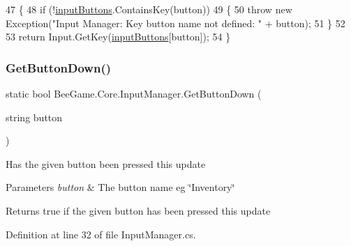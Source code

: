 \begin{DoxyCode}
47         \{
48             \textcolor{keywordflow}{if} (!\hyperlink{class_bee_game_1_1_core_1_1_input_manager_ad0a5b4a5db00803c01ecb3431e208ca1}{inputButtons}.ContainsKey(button))
49             \{
50                 \textcolor{keywordflow}{throw} \textcolor{keyword}{new} Exception(\textcolor{stringliteral}{"Input Manager: Key button name not defined: "} + button);
51             \}
52 
53             \textcolor{keywordflow}{return} Input.GetKey(\hyperlink{class_bee_game_1_1_core_1_1_input_manager_ad0a5b4a5db00803c01ecb3431e208ca1}{inputButtons}[button]);
54         \}
\end{DoxyCode}
\mbox{\label{class_bee_game_1_1_core_1_1_input_manager_ac90aab89652007118b67f60e962103c5}} 
\subsubsection{\texorpdfstring{Get\+Button\+Down()}{GetButtonDown()}}
{\footnotesize\ttfamily static bool Bee\+Game.\+Core.\+Input\+Manager.\+Get\+Button\+Down (\begin{DoxyParamCaption}\item[{string}]{button }\end{DoxyParamCaption})\hspace{0.3cm}{\ttfamily [static]}}



Has the given button been pressed this update 


\begin{DoxyParams}{Parameters}
{\em button} & The button name eg \char`\"{}\+Inventory\char`\"{}\\
\hline
\end{DoxyParams}
\begin{DoxyReturn}{Returns}
true if the given button has been pressed this update
\end{DoxyReturn}


Definition at line 32 of file Input\+Manager.\+cs.


